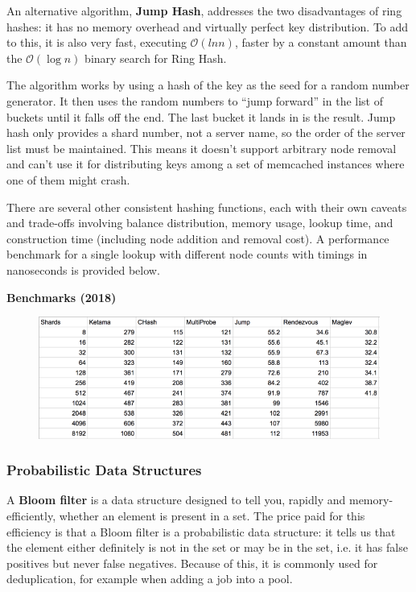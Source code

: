 \documentclass{article}
\begin{document}
    An alternative algorithm, \textbf{Jump Hash}, addresses the two disadvantages of ring hashes: it has no memory overhead and virtually perfect key distribution. To add to this, it is also very fast, executing $\mathcal{O}(ln n)$, faster by a constant amount than the $\mathcal{O}(\log n)$ binary search for Ring Hash.
    
    The algorithm works by using a hash of the key as the seed for a random number generator. It then uses the random numbers to ``jump forward” in the list of buckets until it falls off the end. The last bucket it lands in is the result. Jump hash only provides a shard number, not a server name, so the order of the server list must be maintained. This means it doesn't support arbitrary node removal and can’t use it for distributing keys among a set of memcached instances where one of them might crash.

    There are several other consistent hashing functions, each with their own caveats and trade-offs involving balance distribution, memory usage, lookup time, and construction time (including node addition and removal cost). A performance benchmark for a single lookup with different node counts with timings in nanoseconds is provided below.
    
    \textbf{Benchmarks (2018)}
    \begin{figure}[h]
        \centering
        \includegraphics[width=14cm]{consistent-hashing-benchmarks.png}
    \end{figure}
    
    \subsubsection{Probabilistic Data Structures}
    A \textbf{Bloom filter} is a data structure designed to tell you, rapidly and memory-efficiently, whether an element is present in a set. The price paid for this efficiency is that a Bloom filter is a probabilistic data structure: it tells us that the element either definitely is not in the set or may be in the set, i.e. it has false positives but never false negatives. Because of this, it is commonly used for deduplication, for example when adding a job into a pool.
    
\end{document}
